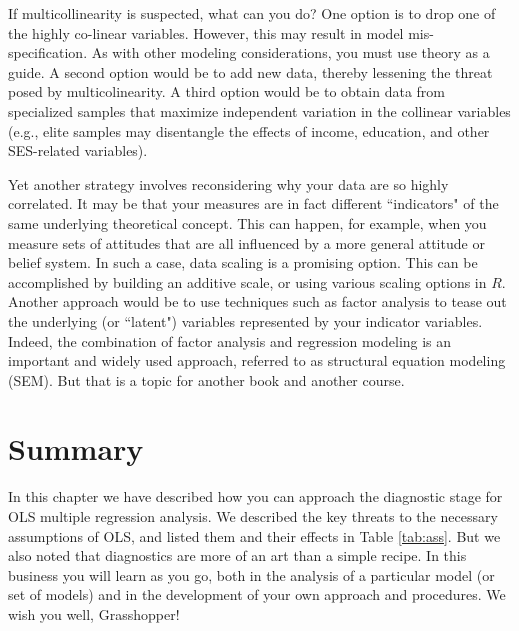 \documentclass[11pt,openany]{book}
\begin{document}
If multicollinearity is suspected, what can you do? One option is to drop one of the highly co-linear variables. However, this may result in model mis-specification. As with other modeling considerations, you must use theory as a guide. A second option would be to add new data, thereby lessening the threat posed by multicolinearity. A third option would be to obtain data from specialized  samples that maximize independent variation in the collinear variables (e.g., elite samples may disentangle the effects of income, education, and other SES-related variables). 

Yet another strategy involves reconsidering why your data are so highly  correlated. It may be that your measures are in fact different ``indicators" of the same underlying theoretical concept. This can happen, for example, when you measure sets of attitudes that are all influenced by a more general attitude or belief system. In such a case, data scaling is a promising option. This can be accomplished by building an additive scale, or using various scaling options in $R$. Another approach would be to use techniques such as factor analysis to tease out the underlying (or ``latent") variables represented by your indicator variables. Indeed, the combination of factor analysis and regression modeling is an important and widely used approach, referred to as structural equation modeling (SEM).  But that is a topic for another book and another course.

\section{Summary}
In this chapter we have described how you can approach the diagnostic stage for OLS multiple regression analysis. We described the key threats to the necessary assumptions of OLS, and listed them and their effects in Table \ref{tab:ass}. But we also noted that diagnostics are more of an art than a simple recipe. In this business you will learn as you go, both in the analysis of a particular model (or set of models) and in the development of  your own approach and procedures. We wish you well, Grasshopper!
\end{document}
